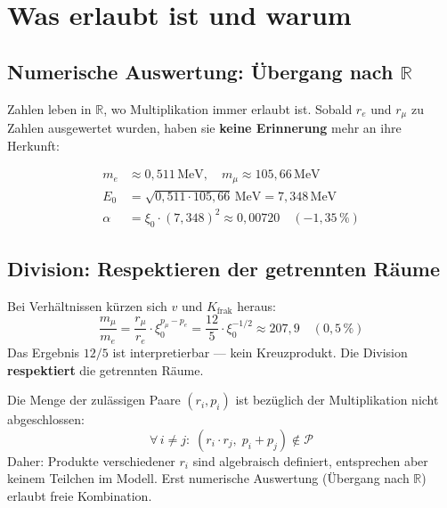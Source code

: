 \section{Was erlaubt ist und warum}

\subsection{Numerische Auswertung: Übergang nach $\mathbb{R}$}

Zahlen leben in $\mathbb{R}$, wo Multiplikation immer erlaubt ist.
Sobald $r_e$ und $r_\mu$ zu Zahlen ausgewertet wurden, haben sie
\textbf{keine Erinnerung} mehr an ihre Herkunft:

\begin{align*}
  m_e &\approx 0{,}511\,\text{MeV}, \quad
  m_\mu \approx 105{,}66\,\text{MeV} \\
  E_0 &= \sqrt{0{,}511 \cdot 105{,}66}\,\text{MeV} = 7{,}348\,\text{MeV} \\
  \alpha &= \xi_0 \cdot (7{,}348)^2 \approx 0{,}00720 \quad (-1{,}35\,\%)
\end{align*}

\subsection{Division: Respektieren der getrennten Räume}

Bei Verhältnissen kürzen sich $v$ und $K_{\text{frak}}$ heraus:
\[
  \frac{m_\mu}{m_e}
  = \frac{r_\mu}{r_e} \cdot \xi_0^{p_\mu - p_e}
  = \frac{12}{5} \cdot \xi_0^{-1/2}
  \approx 207{,}9 \quad (0{,}5\,\%)
\]
Das Ergebnis $12/5$ ist interpretierbar --- kein Kreuzprodukt.
Die Division \textbf{respektiert} die getrennten Räume.

\begin{tcolorbox}[colback=blue!5, colframe=blue!60!black, boxrule=0.5pt,
  arc=2pt, left=3mm, right=3mm, fontupper=\small,
  title={Grundregel --- Die Nichtabschluss-Bedingung}]
Die Menge der zulässigen Paare $(r_i, p_i)$ ist bezüglich der
Multiplikation nicht abgeschlossen:
\[
  \boxed{\forall\, i \neq j:\; (r_i \cdot r_j,\; p_i + p_j) \notin \mathcal{P}}
\]
Daher: Produkte verschiedener $r_i$ sind algebraisch definiert,
entsprechen aber keinem Teilchen im Modell.
Erst numerische Auswertung (Übergang nach $\mathbb{R}$) erlaubt
freie Kombination.
\end{tcolorbox}

